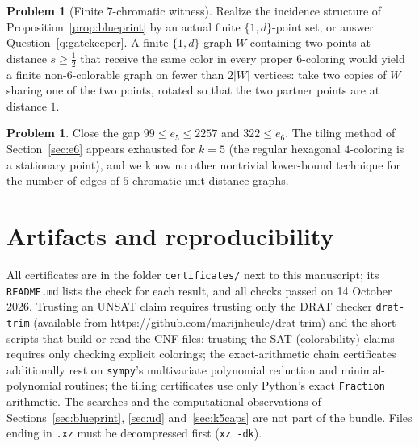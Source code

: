 \documentclass[11pt]{article}
\theoremstyle{definition}
\newtheorem{problem}[theorem]{Problem}
\theoremstyle{remark}
\newcommand{\dd}{d}                          %
\begin{document}
\begin{problem}[Finite $7$-chromatic witness]
Realize the incidence structure of Proposition~\ref{prop:blueprint} by
an actual finite $\{1,\dd\}$-point set, or answer
Question~\ref{q:gatekeeper}.  A finite $\{1,\dd\}$-graph $W$ containing
two points at distance $s\ge\tfrac12$ that receive the same color in
every proper $6$-coloring would yield a finite non-$6$-colorable graph
on fewer than $2|W|$ vertices: take two copies of $W$ sharing one of the
two points, rotated so that the two partner points are at distance $1$.
\end{problem}

\begin{problem}
Close the gap $99\le e_5\le2257$ and $322\le e_6$.  The tiling method
of Section~\ref{sec:e6} appears exhausted for $k=5$ (the regular
hexagonal $4$-coloring is a stationary point), and we know no other
nontrivial lower-bound technique for the number of edges of
$5$-chromatic unit-distance graphs.
\end{problem}

\appendix

\section{Artifacts and reproducibility}\label{app:artifacts}

All certificates are in the folder \texttt{certificates/} next to this
manuscript; its \texttt{README.md} lists the check for each result, and
all checks passed on 14 October 2026.  Trusting an UNSAT claim requires
trusting only the DRAT checker \texttt{drat-trim} \cite{drattrim}
(available from \url{https://github.com/marijnheule/drat-trim}) and the
short scripts that build or read the CNF files; trusting the SAT
(colorability) claims requires only checking explicit colorings; the
exact-arithmetic chain certificates additionally rest on
\texttt{sympy}'s multivariate polynomial reduction and
minimal-polynomial routines; the tiling certificates use only Python's
exact \texttt{Fraction} arithmetic.  The searches and the computational
observations of Sections~\ref{sec:blueprint}, \ref{sec:ud}
and~\ref{sec:k5caps} are not part of the bundle.  Files ending in
\texttt{.xz} must be decompressed first (\texttt{xz -dk}).
\end{document}
